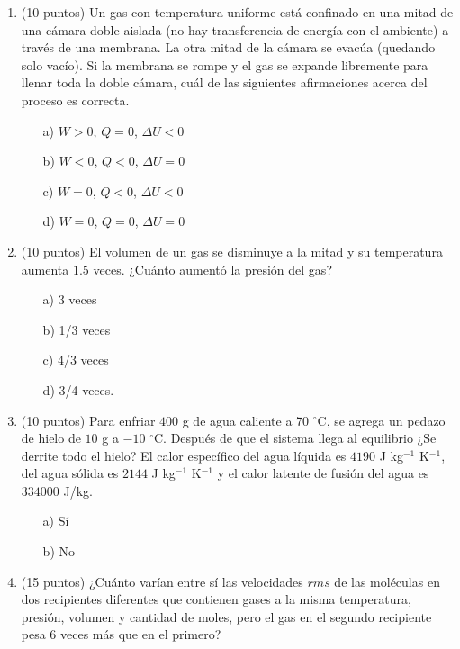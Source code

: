 \documentclass{article}
\begin{document}

\newpage
\begin{enumerate}

\item (10 puntos) 
Un gas con temperatura uniforme está confinado en una mitad de una
cámara doble aislada (no hay transferencia de energía con el ambiente)
a través de una membrana. La otra mitad de la cámara se evacúa
(quedando solo vacío). Si la membrana se rompe y el gas se expande
libremente para llenar toda la doble cámara, cuál de las siguientes
afirmaciones acerca del proceso es correcta. 

\begin{itemize}
\item[a)] $W>0$, $Q=0$, $\Delta U<0$
\item[b)] $W<0$, $Q<0$, $\Delta U=0$
\item[c)] $W=0$, $Q<0$, $\Delta U<0$
\item[d)] $W=0$, $Q=0$, $\Delta U=0$
\end{itemize}

\item (10 puntos)
El volumen de un gas se disminuye a la mitad y su temperatura aumenta $1.5$ veces. ¿Cuánto aumentó la presión del gas?
\begin{itemize}
\item[a)]  3 veces
\item[b)]  1/3 veces
\item[c)]  4/3 veces
\item[d)]  3/4 veces.
\end{itemize}


\item (10 puntos) Para enfriar $400$ g de agua caliente a 70 $^\circ$C,
  se agrega un pedazo de hielo de $10$ g a $-10$
  $^{\circ}$C. Despu\'es de que el sistema llega al equilibrio ¿Se
  derrite todo el hielo? El calor espec\'ifico
  del agua l\'iquida es $4190$ J kg$^{-1}$ K$^{-1}$, del agua
  s\'olida es $2144$ J kg$^{-1}$ K$^{-1}$ y el calor latente de
  fusi\'on del agua es $334000$ J/kg. 
\begin{itemize}
\item[a)] S\'i
\item[b)] No
\end{itemize}

\item (15 puntos) ¿Cuánto var\'ian entre s\'i las velocidades $rms$ de
  las mol\'eculas en dos recipientes diferentes que contienen gases a
  la misma temperatura, presión, volumen y cantidad de moles, pero
  el gas en el segundo recipiente pesa 6 veces más que en el primero?


\end{enumerate}
\end{document}
